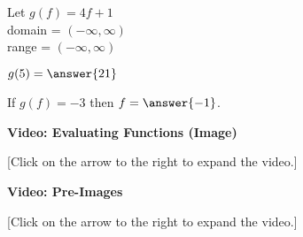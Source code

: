 \documentclass{ximera}
\begin{document}
\begin{question}

Let $g(f) = 4f+1$ \\
domain = $(-\infty, \infty)$ \\
range = $(-\infty, \infty)$


$g(5) = \answer{21}$

If $g(f) = -3$ then $f = \answer{-1}$.
\end{question}






\begin{explanation} \textbf{Video: Evaluating Functions (Image)}

[Click on the arrow to the right to expand the video.]
\begin{expandable} 

\begin{center}
\end{center}

\end{expandable}
\end{explanation}







\begin{explanation} \textbf{Video: Pre-Images}

[Click on the arrow to the right to expand the video.]
\begin{expandable} 

\begin{center}
\end{center}

\end{expandable}
\end{explanation}
\end{document}
